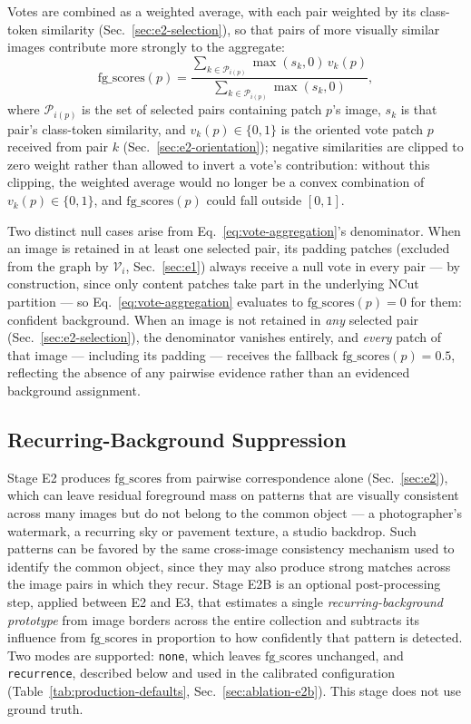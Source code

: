 Votes are combined as a weighted average, with each pair weighted by its
class-token similarity (Sec.~\ref{sec:e2-selection}), so that pairs of more visually similar images contribute more strongly to the aggregate:
\begin{equation}
    \mathrm{fg\_scores}(p) = \frac{\sum_{k \in \mathcal{P}_{i(p)}} \max(s_k, 0)\, v_k(p)}{\sum_{k \in \mathcal{P}_{i(p)}} \max(s_k, 0)},
    \label{eq:vote-aggregation}
\end{equation}
where $\mathcal{P}_{i(p)}$ is the set of selected pairs containing patch
$p$'s image, $s_k$ is that pair's class-token similarity, and $v_k(p) \in
\{0,1\}$ is the oriented vote patch $p$ received from pair $k$
(Sec.~\ref{sec:e2-orientation}); negative similarities are clipped to zero weight rather than allowed to invert a vote's contribution: without this clipping, the weighted average would no longer be a convex combination of $v_k(p) \in \{0,1\}$, and $\mathrm{fg\_scores}(p)$ could fall outside $[0,1]$.

Two distinct null cases arise from Eq.~\ref{eq:vote-aggregation}'s
denominator. When an image is retained in at least one selected pair, its
padding patches (excluded from the graph by $\mathcal{V}_i$,
Sec.~\ref{sec:e1}) always receive a null vote in every pair — by
construction, since only content patches take part in the underlying NCut
partition — so Eq.~\ref{eq:vote-aggregation} evaluates to
$\mathrm{fg\_scores}(p)=0$ for them: confident background. When an image is not retained in \emph{any} selected pair (Sec.~\ref{sec:e2-selection}), the denominator vanishes entirely, and \emph{every} patch of that image — including its padding — receives the fallback $\mathrm{fg\_scores}(p)=0.5$, reflecting the absence of any pairwise evidence rather than an evidenced background assignment.

\subsection{Recurring-Background Suppression}
\label{sec:e2b}

Stage E2 produces $\mathrm{fg\_scores}$ from pairwise correspondence alone (Sec.~\ref{sec:e2}), which can leave residual foreground mass on patterns that are visually consistent across many images but do not belong to the common object — a photographer's watermark, a recurring sky or pavement texture, a studio backdrop. Such patterns can be favored by the same cross-image consistency mechanism used to identify the common object, since they may also produce strong matches across the image pairs in which they recur. Stage E2B is an optional post-processing step, applied between E2 and E3, that estimates a single \emph{recurring-background prototype} from image borders across the entire collection and subtracts its influence from $\mathrm{fg\_scores}$ in proportion to how confidently that pattern is detected. Two modes are supported: \texttt{none}, which leaves $\mathrm{fg\_scores}$ unchanged, and \texttt{recurrence}, described below and used in the calibrated configuration (Table~\ref{tab:production-defaults}, Sec.~\ref{sec:ablation-e2b}). This stage does not use ground truth.

